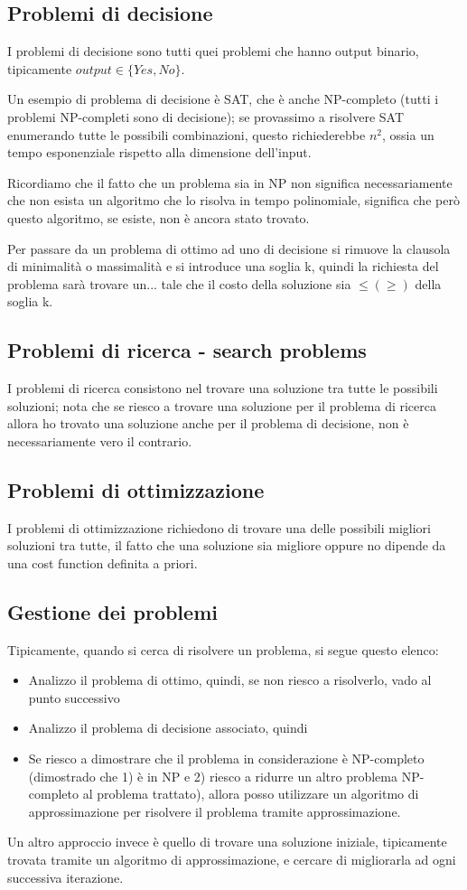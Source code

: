 \documentclass[12pt,a4paper]{article}
\begin{document}
\subsection{Problemi di decisione}
I problemi di decisione sono tutti quei problemi che hanno output binario, tipicamente $output \in \lbrace Yes, No \rbrace$.

Un esempio di problema di decisione è SAT, che è anche NP-completo (tutti i problemi NP-completi sono di decisione); se provassimo a risolvere SAT enumerando tutte le possibili combinazioni, questo richiederebbe $n^{2}$, ossia un tempo esponenziale rispetto alla dimensione dell'input.

Ricordiamo che il fatto che un problema sia in NP non significa necessariamente che non esista un algoritmo che lo risolva in tempo polinomiale, significa che però questo algoritmo, se esiste, non è ancora stato trovato.

Per passare da un problema di ottimo ad uno di decisione si rimuove la clausola di minimalità o massimalità e si introduce una soglia k, quindi la richiesta del problema sarà trovare un... tale che il costo della soluzione sia $\leq (\geq)$ della soglia k.

\subsection{Problemi di ricerca - search problems}
I problemi di ricerca consistono nel trovare una soluzione tra tutte le possibili soluzioni; nota che se riesco a trovare una soluzione per il problema di ricerca allora ho trovato una soluzione anche per il problema di decisione, non è necessariamente vero il contrario.

\subsection{Problemi di ottimizzazione}
I problemi di ottimizzazione richiedono di trovare una delle possibili migliori soluzioni tra tutte, il fatto che una soluzione sia migliore oppure no dipende da una cost function definita a priori.

\subsection{Gestione dei problemi}
Tipicamente, quando si cerca di risolvere un problema, si segue questo elenco:
\begin{itemize}
\item Analizzo il problema di ottimo, quindi, se non riesco a risolverlo, vado al punto successivo
\item Analizzo il problema di decisione associato, quindi
\item Se riesco a dimostrare che il problema in considerazione è NP-completo (dimostrado che 1) è in NP e 2) riesco a ridurre un altro problema NP-completo al problema trattato), allora posso utilizzare un algoritmo di approssimazione per risolvere il problema tramite approssimazione.
\end{itemize}
Un altro approccio invece è quello di trovare una soluzione iniziale, tipicamente trovata tramite un algoritmo di approssimazione, e cercare di migliorarla ad ogni successiva iterazione.
\end{document}
